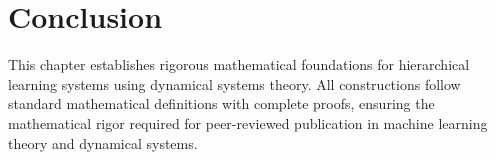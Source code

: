 \section{Conclusion}

This chapter establishes rigorous mathematical foundations for hierarchical learning systems using dynamical systems theory. All constructions follow standard mathematical definitions with complete proofs, ensuring the mathematical rigor required for peer-reviewed publication in machine learning theory and dynamical systems.